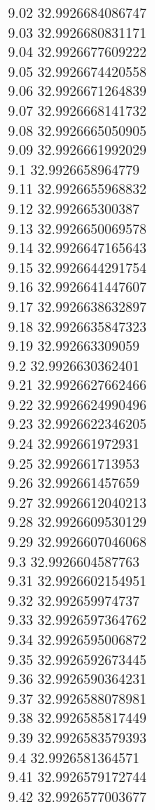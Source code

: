 {9.02	32.9926684086747\\
9.03	32.9926680831171\\
9.04	32.9926677609222\\
9.05	32.9926674420558\\
9.06	32.9926671264839\\
9.07	32.9926668141732\\
9.08	32.9926665050905\\
9.09	32.9926661992029\\
9.1	32.9926658964779\\
9.11	32.9926655968832\\
9.12	32.992665300387\\
9.13	32.9926650069578\\
9.14	32.9926647165643\\
9.15	32.9926644291754\\
9.16	32.9926641447607\\
9.17	32.9926638632897\\
9.18	32.9926635847323\\
9.19	32.992663309059\\
9.2	32.9926630362401\\
9.21	32.9926627662466\\
9.22	32.9926624990496\\
9.23	32.9926622346205\\
9.24	32.992661972931\\
9.25	32.992661713953\\
9.26	32.992661457659\\
9.27	32.9926612040213\\
9.28	32.9926609530129\\
9.29	32.9926607046068\\
9.3	32.9926604587763\\
9.31	32.9926602154951\\
9.32	32.992659974737\\
9.33	32.9926597364762\\
9.34	32.9926595006872\\
9.35	32.9926592673445\\
9.36	32.9926590364231\\
9.37	32.9926588078981\\
9.38	32.9926585817449\\
9.39	32.9926583579393\\
9.4	32.9926581364571\\
9.41	32.9926579172744\\
9.42	32.9926577003677\\
}
